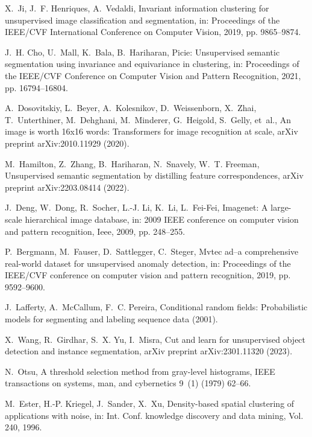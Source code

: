 \documentclass[final,5p,times,twocolumn]{elsarticle}
\begin{document}
\begin{thebibliography}{10}
X.~Ji, J.~F. Henriques, A.~Vedaldi, Invariant information clustering for
  unsupervised image classification and segmentation, in: Proceedings of the
  IEEE/CVF International Conference on Computer Vision, 2019, pp. 9865--9874.

J.~H. Cho, U.~Mall, K.~Bala, B.~Hariharan, Picie: Unsupervised semantic
  segmentation using invariance and equivariance in clustering, in: Proceedings
  of the IEEE/CVF Conference on Computer Vision and Pattern Recognition, 2021,
  pp. 16794--16804.

A.~Dosovitskiy, L.~Beyer, A.~Kolesnikov, D.~Weissenborn, X.~Zhai,
  T.~Unterthiner, M.~Dehghani, M.~Minderer, G.~Heigold, S.~Gelly, et~al., An
  image is worth 16x16 words: Transformers for image recognition at scale,
  arXiv preprint arXiv:2010.11929 (2020).

M.~Hamilton, Z.~Zhang, B.~Hariharan, N.~Snavely, W.~T. Freeman, Unsupervised
  semantic segmentation by distilling feature correspondences, arXiv preprint
  arXiv:2203.08414 (2022).

J.~Deng, W.~Dong, R.~Socher, L.-J. Li, K.~Li, L.~Fei-Fei, Imagenet: A
  large-scale hierarchical image database, in: 2009 IEEE conference on computer
  vision and pattern recognition, Ieee, 2009, pp. 248--255.

P.~Bergmann, M.~Fauser, D.~Sattlegger, C.~Steger, Mvtec ad--a comprehensive
  real-world dataset for unsupervised anomaly detection, in: Proceedings of the
  IEEE/CVF conference on computer vision and pattern recognition, 2019, pp.
  9592--9600.

J.~Lafferty, A.~McCallum, F.~C. Pereira, Conditional random fields:
  Probabilistic models for segmenting and labeling sequence data (2001).

X.~Wang, R.~Girdhar, S.~X. Yu, I.~Misra, Cut and learn for unsupervised object
  detection and instance segmentation, arXiv preprint arXiv:2301.11320 (2023).

N.~Otsu, A threshold selection method from gray-level histograms, IEEE
  transactions on systems, man, and cybernetics 9~(1) (1979) 62--66.

M.~Ester, H.-P. Kriegel, J.~Sander, X.~Xu, Density-based spatial clustering of
  applications with noise, in: Int. Conf. knowledge discovery and data mining,
  Vol. 240, 1996.


\end{thebibliography}
\end{document}
